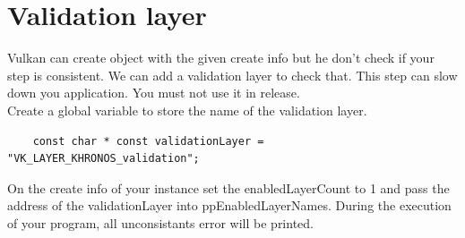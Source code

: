 \documentclass{article}
\begin{document}
\section{Validation layer}
Vulkan can create object with the given create info but he don't check if your step is consistent. We can add a validation layer to check that. This step can slow down you application. You must not use it in release. \\
Create a global variable to store the name of the validation layer.
\begin{lstlisting}
	const char * const validationLayer = "VK_LAYER_KHRONOS_validation";
\end{lstlisting}
On the create info of your instance set the enabledLayerCount to 1 and pass the address of the validationLayer into ppEnabledLayerNames. During the execution of your program, all unconsistants error will be printed.
\end{document}
